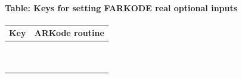 \documentclass[letterpaper,10pt,english]{sphinxmanual}
\begin{document}
\paragraph{Table: Keys for setting FARKODE real optional inputs}
\label{f_interface/Usage:finterface-rinoptiontable}\label{f_interface/Usage:table-keys-for-setting-farkode-real-optional-inputs}
\begin{tabulary}{\linewidth}{|L|L|}
\hline
\textbf{\relax 
Key
} & \textbf{\relax 
ARKode routine
}\\\hline

 & 
{\hyperref[c_interface/User_callable:ARKodeSetInitStep]{}}
\\\hline

 & 
{\hyperref[c_interface/User_callable:ARKodeSetMaxStep]{}}
\\\hline

 & 
{\hyperref[c_interface/User_callable:ARKodeSetMinStep]{}}
\\\hline

 & 
{\hyperref[c_interface/User_callable:ARKodeSetStopTime]{}}
\\\hline

 & 
{\hyperref[c_interface/User_callable:ARKodeSetNonlinConvCoef]{}}
\\\hline

 & 
{\hyperref[c_interface/User_callable:ARKodeSetCFLFraction]{}}
\\\hline

 & 
{\hyperref[c_interface/User_callable:ARKodeSetSafetyFactor]{}}
\\\hline

 & 
{\hyperref[c_interface/User_callable:ARKodeSetErrorBias]{}}
\\\hline

 & 
{\hyperref[c_interface/User_callable:ARKodeSetMaxGrowth]{}}
\\\hline

 & 
{\hyperref[c_interface/User_callable:ARKodeSetMaxFirstGrowth]{}}
\\\hline


\end{tabulary}
\end{document}
